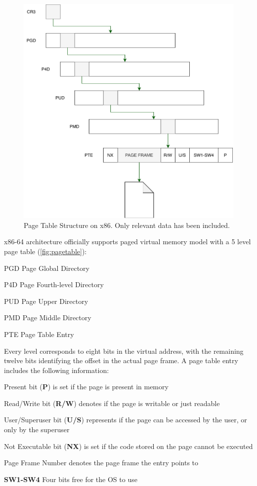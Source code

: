 \documentclass[conference]{IEEEtran}
\begin{document}
\begin{figure}[]
  \centering
  \includegraphics[width = .35 \textwidth]{img/pagetable.pdf}
  \caption{Page Table Structure on x86. Only relevant data has been included.}
  \label{fig:pagetable}
\end{figure}
x86-64 architecture officially supports paged virtual memory model with a 5 
level page table (\autoref{fig:pagetable}):
\begin{LaTeXdescription}
    \item[PGD] Page Global Directory
    \item[P4D] Page Fourth-level Directory
    \item[PUD] Page Upper Directory
    \item[PMD] Page Middle Directory
    \item[PTE] Page Table Entry
\end{LaTeXdescription}

Every level corresponds to eight bits in the virtual address, with the remaining twelve
bits identifying the offset in the actual page frame. A page table entry
includes the following information:
\begin{LaTeXdescription}
    \item[Present bit (\textbf{P})] is set if the page is present in memory
    \item[Read/Write bit (\textbf{R/W})] denotes if the page is writable or just
         readable
    \item[User/Superuser bit (\textbf{U/S})] represents if the page can be 
    accessed by the user, or only by the superuser
    \item[Not Executable bit (\textbf{NX})] is set if the code stored on the 
    page cannot be executed
    \item[Page Frame Number] denotes the page frame the entry points to
    \item[\textbf{SW1-SW4}] Four bits free for the OS to use
\end{LaTeXdescription}
\end{document}
